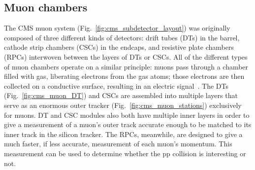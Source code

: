 \subsection{Muon chambers}
The CMS muon system (Fig.~\ref{fig:cms_subdetector_layout}) was originally composed of three different kinds of detectors: drift tubes (DTs) in the barrel, cathode strip chambers (CSCs) in the endcaps, and resistive plate chambers (RPCs) interwoven between the layers of DTs or CSCs. 
All of the different types of muon chambers operate on a similar principle: muons pass through a chamber filled with gas, liberating electrons from the gas atoms; those electrons are then collected on a conductive surface, resulting in an electric signal~\cite{CERN-LHCC-97-032}. 
The DTs (Fig.~\ref{fig:cms_muon_DT}) and CSCs are assembled into multiple layers that serve as an enormous outer tracker (Fig.~\ref{fig:cms_muon_stations}) exclusively for muons. 
DT and CSC modules also both have multiple inner layers in order to give a measurement of a muon's outer track accurate enough to be matched to its inner track in the silicon tracker. 
The RPCs, meanwhile, are designed to give a much faster, if less accurate, measurement of each muon's momentum. 
This measurement can be used to determine whether the pp collision is interesting or not.

